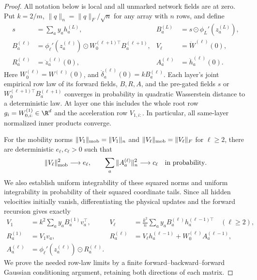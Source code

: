 \begin{proof}
All notation below is local and all unmarked network fields are at zero.
Put $k=2/m$,
$\|q\|_n=\|q\|_F/\sqrt n$ for any array with $n$ rows, and define
\begin{align}
 s&=\sum_a y_a h_a^{(L)},&
 B_a^{(L)}&=s\odot\phi_L'(z_a^{(L)}),\nonumber\\
 B_a^{(\ell)}&=\phi_\ell'(z_a^{(\ell)})\odot
                  W_0^{(\ell+1)\top}B_a^{(\ell+1)},
 &V_\ell&=\ddot W^{(\ell)}(0),\nonumber\\
 R_a^{(\ell)}&=\ddot z_a^{(\ell)}(0),&
 A_a^{(\ell)}&=\ddot h_a^{(\ell)}(0).
 \label{fl:initial-fields}
\end{align}
Here $W_0^{(\ell)}=W^{(\ell)}(0)$, and
$\dot\delta_a^{(\ell)}(0)=kB_a^{(\ell)}$.
Each layer's joint empirical row law of its forward fields, $B,R,A$, and
the pre-gated fields $s$ or $W_0^{(\ell+1)\top}B_a^{(\ell+1)}$
converges in probability in quadratic Wasserstein distance to a deterministic
law. At layer one this includes the whole root row
$g_i=W_{0,i:}^{(1)}\in\R^d$ and the acceleration row $V_{1,i:}$.
In particular, all same-layer normalized inner products converge.

For the mobility norms
$\|V_1\|_{\rm mob}=\|V_1\|_n$ and
$\|V_\ell\|_{\rm mob}=\|V_\ell\|_F$ for $\ell\ge2$, there are
deterministic $e_\ell,c_\ell>0$ such that
\begin{equation}
 \|V_\ell\|_{\rm mob}^2\longrightarrow e_\ell,
 \qquad \sum_a\|A_a^{(\ell)}\|_n^2\longrightarrow c_\ell
 \quad\hbox{in probability}.
 \label{fl:positive-accelerations}
\end{equation}
We also establish uniform integrability of these squared norms and uniform
integrability in probability of their squared coordinate tails.
Since all hidden velocities initially vanish, differentiating the physical
updates and the forward recursion gives exactly
\begin{align}
 V_1&=k^2\sum_a y_aB_a^{(1)}v_a^\top,&
 V_\ell&=\frac{k^2}{n}\sum_a y_aB_a^{(\ell)}
                    h_a^{(\ell-1)\top}\quad(\ell\ge2),\nonumber\\
 R_a^{(1)}&=V_1v_a,&
 R_a^{(\ell)}&=V_\ell h_a^{(\ell-1)}
                         +W_0^{(\ell)}A_a^{(\ell-1)},\nonumber\\
 A_a^{(\ell)}&=\phi_\ell'(z_a^{(\ell)})\odot R_a^{(\ell)}.
 \label{fl:acceleration-recursion}
\end{align}
We prove the needed row-law limits by a finite forward--backward--forward
Gaussian conditioning argument, retaining both directions of each matrix.


\end{proof}
